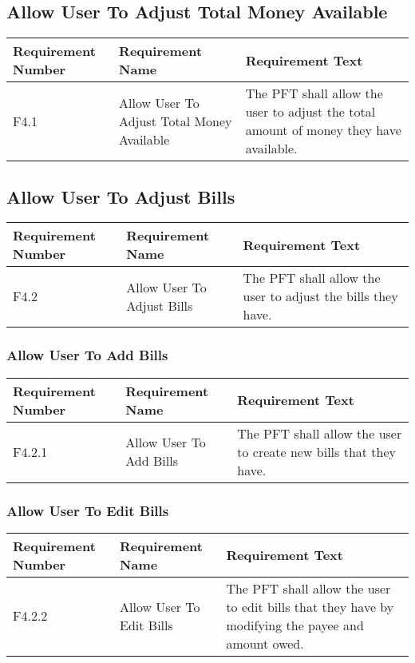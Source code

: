 \documentclass{article}
\begin{document}
\subsection{Allow User To Adjust Total Money Available}

\begin{longtable}{|p{2cm}|p{6cm}| p{6cm}|}
    \hline
    \textbf{Requirement Number} & \textbf{Requirement Name} & \textbf{Requirement Text}\\
    \hline
    F4.1 & Allow User To Adjust Total Money Available & The PFT shall allow the user to adjust the total amount of money they have available.  \\
    \hline
\end{longtable}

\subsection{Allow User To Adjust Bills}

\begin{longtable}{|p{2cm}|p{6cm}| p{6cm}|}
    \hline
    \textbf{Requirement Number} & \textbf{Requirement Name} & \textbf{Requirement Text}\\
    \hline
    F4.2 & Allow User To Adjust Bills & The PFT shall allow the user to adjust the bills they have.  \\
    \hline
\end{longtable}

\subsubsection{Allow User To Add Bills}

\begin{longtable}{|p{2cm}|p{6cm}| p{6cm}|}
    \hline
    \textbf{Requirement Number} & \textbf{Requirement Name} & \textbf{Requirement Text}\\
    \hline
    F4.2.1 & Allow User To Add Bills & The PFT shall allow the user to create new bills that they have.  \\
    \hline
\end{longtable}

\subsubsection{Allow User To Edit Bills}

\begin{longtable}{|p{2cm}|p{6cm}| p{6cm}|}
    \hline
    \textbf{Requirement Number} & \textbf{Requirement Name} & \textbf{Requirement Text}\\
    \hline
    F4.2.2 & Allow User To Edit Bills & The PFT shall allow the user to edit bills that they have by modifying the payee and amount owed.  \\
    \hline
\end{longtable}
\end{document}
